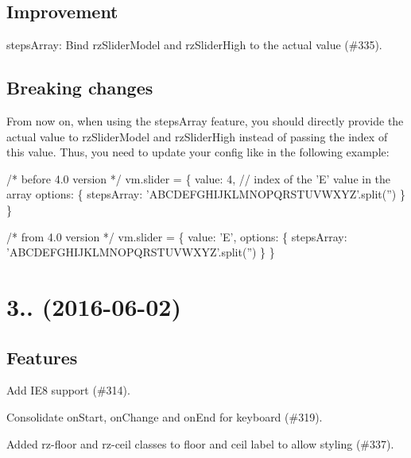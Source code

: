 \subsection*{Improvement}


\begin{DoxyItemize}
\item {\ttfamily steps\+Array}\+: Bind rz\+Slider\+Model and rz\+Slider\+High to the actual value (\#335).
\end{DoxyItemize}

\subsection*{Breaking changes}


\begin{DoxyItemize}
\item From now on, when using the {\ttfamily steps\+Array} feature, you should directly provide the actual value to rz\+Slider\+Model and rz\+Slider\+High instead of passing the index of this value. Thus, you need to update your config like in the following example\+: 
\begin{DoxyCode}
/* before 4.0 version */
vm.slider = \{
    value: 4, // index of the 'E' value in the array
    options: \{
        stepsArray: 'ABCDEFGHIJKLMNOPQRSTUVWXYZ'.split('')
    \}
\}

/* from 4.0 version */
vm.slider = \{
    value: 'E',
    options: \{
        stepsArray: 'ABCDEFGHIJKLMNOPQRSTUVWXYZ'.split('')
    \}
\}
\end{DoxyCode}

\end{DoxyItemize}

\section*{3.. (2016-\/06-\/02)}

\subsection*{Features}


\begin{DoxyItemize}
\item Add I\+E8 support (\#314).
\item Consolidate on\+Start, on\+Change and on\+End for keyboard (\#319).
\item Added {\ttfamily rz-\/floor} and {\ttfamily rz-\/ceil} classes to floor and ceil label to allow styling (\#337).
\end{DoxyItemize}

